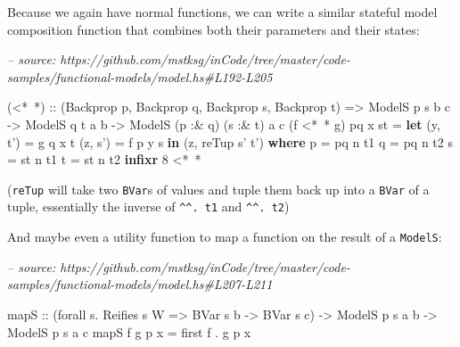 \documentclass[]{article}
\newenvironment{Shaded}{}{}
\newcommand{\CommentTok}[1]{\textcolor[rgb]{0.38,0.63,0.69}{\textit{#1}}}
\newcommand{\DataTypeTok}[1]{\textcolor[rgb]{0.56,0.13,0.00}{#1}}
\newcommand{\DecValTok}[1]{\textcolor[rgb]{0.25,0.63,0.44}{#1}}
\newcommand{\FunctionTok}[1]{\textcolor[rgb]{0.02,0.16,0.49}{#1}}
\newcommand{\KeywordTok}[1]{\textcolor[rgb]{0.00,0.44,0.13}{\textbf{#1}}}
\newcommand{\NormalTok}[1]{#1}
\newcommand{\OtherTok}[1]{\textcolor[rgb]{0.00,0.44,0.13}{#1}}
\begin{document}
Because we again have normal functions, we can write a similar stateful model
composition function that combines both their parameters and their states:

\begin{Shaded}
\begin{Highlighting}[]
\CommentTok{-- source: https://github.com/mstksg/inCode/tree/master/code-samples/functional-models/model.hs#L192-L205}

\NormalTok{(}\FunctionTok{<*~*}\NormalTok{)}
\OtherTok{  ::}\NormalTok{ (}\DataTypeTok{Backprop}\NormalTok{ p, }\DataTypeTok{Backprop}\NormalTok{ q, }\DataTypeTok{Backprop}\NormalTok{ s, }\DataTypeTok{Backprop}\NormalTok{ t)}
    \OtherTok{=>} \DataTypeTok{ModelS}\NormalTok{  p        s       b c}
    \OtherTok{->} \DataTypeTok{ModelS}\NormalTok{       q        t  a b}
    \OtherTok{->} \DataTypeTok{ModelS}\NormalTok{ (p }\FunctionTok{:&}\NormalTok{ q) (s }\FunctionTok{:&}\NormalTok{ t) a c}
\NormalTok{(f }\FunctionTok{<*~*}\NormalTok{ g) pq x st }\FunctionTok{=} \KeywordTok{let}\NormalTok{ (y, t') }\FunctionTok{=}\NormalTok{ g q x t}
\NormalTok{                         (z, s') }\FunctionTok{=}\NormalTok{ f p y s}
                     \KeywordTok{in}\NormalTok{  (z, reTup s' t')}
  \KeywordTok{where}
\NormalTok{    p }\FunctionTok{=}\NormalTok{ pq }\FunctionTok{^^.}\NormalTok{ t1}
\NormalTok{    q }\FunctionTok{=}\NormalTok{ pq }\FunctionTok{^^.}\NormalTok{ t2}
\NormalTok{    s }\FunctionTok{=}\NormalTok{ st }\FunctionTok{^^.}\NormalTok{ t1}
\NormalTok{    t }\FunctionTok{=}\NormalTok{ st }\FunctionTok{^^.}\NormalTok{ t2}
\KeywordTok{infixr} \DecValTok{8} \FunctionTok{<*~*}
\end{Highlighting}
\end{Shaded}

(\texttt{reTup} will take two \texttt{BVar}s of values and tuple them back up
into a \texttt{BVar} of a tuple, essentially the inverse of
\texttt{\^{}\^{}.\ t1} and \texttt{\^{}\^{}.\ t2})

And maybe even a utility function to map a function on the result of a
\texttt{ModelS}:

\begin{Shaded}
\begin{Highlighting}[]
\CommentTok{-- source: https://github.com/mstksg/inCode/tree/master/code-samples/functional-models/model.hs#L207-L211}

\NormalTok{mapS}
\OtherTok{    ::}\NormalTok{ (forall s}\FunctionTok{.} \DataTypeTok{Reifies}\NormalTok{ s }\DataTypeTok{W} \OtherTok{=>} \DataTypeTok{BVar}\NormalTok{ s b }\OtherTok{->} \DataTypeTok{BVar}\NormalTok{ s c)}
    \OtherTok{->} \DataTypeTok{ModelS}\NormalTok{ p s a b}
    \OtherTok{->} \DataTypeTok{ModelS}\NormalTok{ p s a c}
\NormalTok{mapS f g p x }\FunctionTok{=}\NormalTok{ first f }\FunctionTok{.}\NormalTok{ g p x}
\end{Highlighting}
\end{Shaded}
\end{document}
